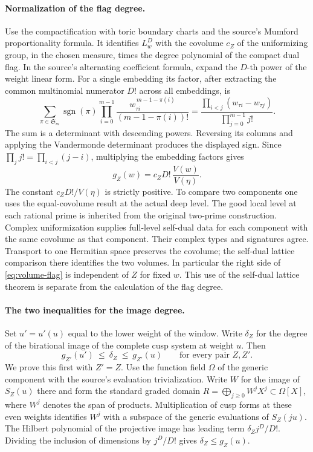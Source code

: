 \paragraph{Normalization of the flag degree.}
Use the compactification with toric boundary charts and the source's
Mumford proportionality formula. It identifies \(L_w^D\) with the
covolume \(c_Z\) of the uniformizing group, in the chosen measure,
times the degree polynomial of the compact dual flag. In the source's
alternating coefficient formula, expand the \(D\)-th power of the weight
linear form. For a single embedding its factor, after extracting the common
multinomial numerator \(D!\) across all embeddings, is
\[
 \sum_{\pi\in\mathfrak S_m}\operatorname{sgn}(\pi)
 \prod_{i=0}^{m-1}\frac{w_{\tau i}^{\,m-1-\pi(i)}}{(m-1-\pi(i))!}
 =\frac{\prod_{i<j}(w_{\tau i}-w_{\tau j})}
             {\prod_{j=0}^{m-1}j!}.
\]
The sum is a determinant with descending powers. Reversing its columns
and applying the Vandermonde determinant produces the displayed sign.
Since \(\prod_jj!=\prod_{i<j}(j-i)\), multiplying the embedding factors
gives
\begin{equation}\label{eq:volume-flag}
 g_Z(w)=c_Z D!\,\frac{V(w)}{V(\eta)} .
\end{equation}
The constant \(c_ZD!/V(\eta)\) is strictly positive. To compare two
components one uses the equal-covolume result at the actual deep level.
The good local level at each rational prime is inherited from the
original two-prime construction. Complex uniformization supplies
full-level self-dual data for each component with the same covolume as
that component. Their complex types and signatures agree. Transport to
one Hermitian space preserves the covolume; the self-dual lattice
comparison there identifies the two volumes. In particular the
right side of \eqref{eq:volume-flag} is independent of \(Z\) for fixed
\(w\). This use of the self-dual lattice theorem is separate from the
calculation of the flag degree.

\paragraph{The two inequalities for the image degree.}
Set \(u'=u'(u)\) equal to the lower weight of the window. Write
\(\delta_Z\) for the degree of the birational image of the complete cusp
system at weight \(u\). Then
\begin{equation}\label{eq:volume-sandwich}
 g_{Z'}(u')\ \le\ \delta_Z\ \le\ g_{Z'}(u)
 \qquad\text{for every pair }Z,Z'.
\end{equation}
We prove this first with \(Z'=Z\). Use the function field \(\Omega\)
of the generic component with the source's evaluation trivialization.
Write \(W\) for the image of \(S_Z(u)\) there and form the standard
graded domain \(R=\bigoplus_{j\ge0}W^j X^j\subset \Omega[X]\),
where \(W^j\) denotes the span of products. Multiplication of cusp
forms at these even weights identifies \(W^j\) with a subspace of
the generic evaluations of \(S_Z(ju)\). The Hilbert polynomial of the
projective image has leading term \(\delta_Z j^D/D!\). Dividing the
inclusion of dimensions by \(j^D/D!\) gives \(\delta_Z\le g_Z(u)\).

